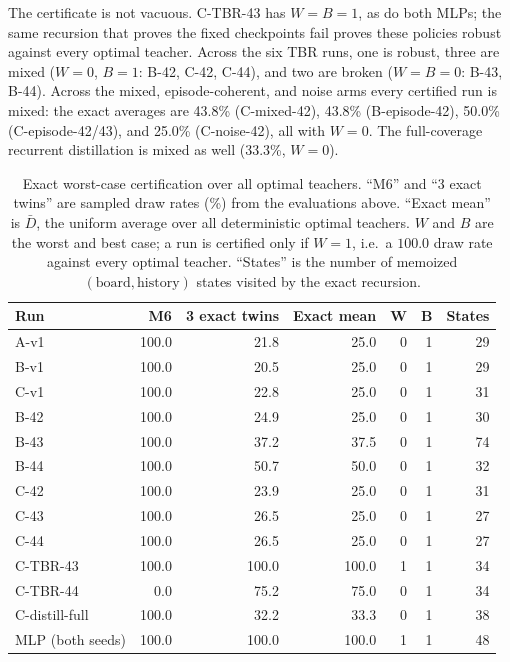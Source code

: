 \documentclass[conference]{IEEEtran}
\begin{document}
The certificate is not vacuous. C-TBR-43 has $W=B=1$, as do both MLPs; the same recursion that proves the fixed checkpoints fail proves these policies robust against every optimal teacher. Across the six TBR runs, one is robust, three are mixed ($W=0$, $B=1$: B-42, C-42, C-44), and two are broken ($W=B=0$: B-43, B-44). Across the mixed, episode-coherent, and noise arms every certified run is mixed: the exact averages are 43.8\% (C-mixed-42), 43.8\% (B-episode-42), 50.0\% (C-episode-42/43), and 25.0\% (C-noise-42), all with $W=0$. The full-coverage recurrent distillation is mixed as well (33.3\%, $W=0$).

\begin{table}[t]
\centering
\caption{Exact worst-case certification over all optimal teachers. ``M6'' and ``3 exact twins'' are sampled draw rates (\%) from the evaluations above. ``Exact mean'' is $\bar D$, the uniform average over all deterministic optimal teachers. $W$ and $B$ are the worst and best case; a run is certified only if $W=1$, i.e.\ a $100.0$ draw rate against every optimal teacher. ``States'' is the number of memoized $(\text{board},\text{history})$ states visited by the exact recursion.}
\label{tab:certificate}
\setlength{\tabcolsep}{4pt}
\small
\begin{tabular*}{\textwidth}{@{\extracolsep{\fill}}lrrrrrr@{}}
\toprule
\textbf{Run} & \textbf{M6} & \textbf{3 exact twins} & \textbf{Exact mean} & $\boldsymbol{W}$ & $\boldsymbol{B}$ & \textbf{States} \\
\midrule
A-v1 & 100.0 & 21.8 & 25.0 & 0 & 1 & 29 \\
B-v1 & 100.0 & 20.5 & 25.0 & 0 & 1 & 29 \\
C-v1 & 100.0 & 22.8 & 25.0 & 0 & 1 & 31 \\
B-42 & 100.0 & 24.9 & 25.0 & 0 & 1 & 30 \\
B-43 & 100.0 & 37.2 & 37.5 & 0 & 1 & 74 \\
B-44 & 100.0 & 50.7 & 50.0 & 0 & 1 & 32 \\
C-42 & 100.0 & 23.9 & 25.0 & 0 & 1 & 31 \\
C-43 & 100.0 & 26.5 & 25.0 & 0 & 1 & 27 \\
C-44 & 100.0 & 26.5 & 25.0 & 0 & 1 & 27 \\
\midrule
C-TBR-43 & 100.0 & 100.0 & 100.0 & 1 & 1 & 34 \\
C-TBR-44 & 0.0 & 75.2 & 75.0 & 0 & 1 & 34 \\
\midrule
C-distill-full & 100.0 & 32.2 & 33.3 & 0 & 1 & 38 \\
MLP (both seeds) & 100.0 & 100.0 & 100.0 & 1 & 1 & 48 \\
\bottomrule
\end{tabular*}
\end{table}
\end{document}
